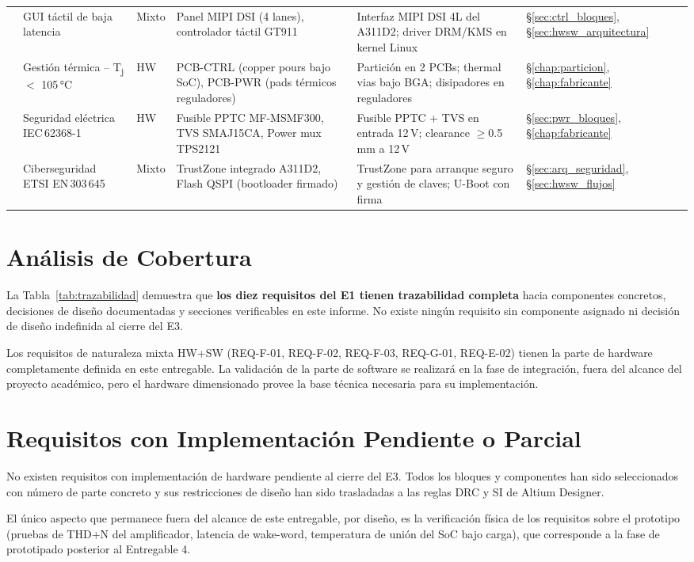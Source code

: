 \begin{longtable}{L{1.5cm} L{3cm} C{1.3cm} L{3.2cm} L{3cm} C{1.5cm}}
   & GUI táctil de baja latencia & Mixto &
    Panel MIPI DSI (4 lanes), controlador táctil GT911 &
    Interfaz MIPI DSI 4L del A311D2; driver DRM/KMS en kernel Linux &
    \S\ref{sec:ctrl_bloques}, \S\ref{sec:hwsw_arquitectura} \\
   & Gestión térmica -- T\textsubscript{j} $<$ 105\,°C & HW &
    PCB-CTRL (copper pours bajo SoC), PCB-PWR (pads térmicos reguladores) &
    Partición en 2 PCBs; thermal vias bajo BGA; disipadores en reguladores &
    \S\ref{chap:particion}, \S\ref{chap:fabricante} \\
   & Seguridad eléctrica IEC\,62368-1 & HW &
    Fusible PPTC MF-MSMF300, TVS SMAJ15CA, Power mux TPS2121 &
    Fusible PPTC + TVS en entrada 12\,V; clearance $\geq$0.5\,mm a 12\,V &
    \S\ref{sec:pwr_bloques}, \S\ref{chap:fabricante} \\
   & Ciberseguridad ETSI EN\,303\,645 & Mixto &
    TrustZone integrado A311D2, Flash QSPI (bootloader firmado) &
    TrustZone para arranque seguro y gestión de claves; U-Boot con firma &
    \S\ref{sec:arq_seguridad}, \S\ref{sec:hwsw_flujos} \\
\end{longtable}

\section{Análisis de Cobertura}
\label{sec:traz_cobertura}

La Tabla~\ref{tab:trazabilidad} demuestra que \textbf{los diez requisitos del E1 tienen trazabilidad completa} hacia componentes concretos, decisiones de diseño documentadas y secciones verificables en este informe. No existe ningún requisito sin componente asignado ni decisión de diseño indefinida al cierre del E3.

Los requisitos de naturaleza mixta HW+SW (REQ-F-01, REQ-F-02, REQ-F-03, REQ-G-01, REQ-E-02) tienen la parte de hardware completamente definida en este entregable. La validación de la parte de software se realizará en la fase de integración, fuera del alcance del proyecto académico, pero el hardware dimensionado provee la base técnica necesaria para su implementación.

\section{Requisitos con Implementación Pendiente o Parcial}
\label{sec:traz_pendientes}

No existen requisitos con implementación de hardware pendiente al cierre del E3. Todos los bloques y componentes han sido seleccionados con número de parte concreto y sus restricciones de diseño han sido trasladadas a las reglas DRC y SI de Altium Designer.

El único aspecto que permanece fuera del alcance de este entregable, por diseño, es la verificación física de los requisitos sobre el prototipo (pruebas de THD+N del amplificador, latencia de wake-word, temperatura de unión del SoC bajo carga), que corresponde a la fase de prototipado posterior al Entregable 4.
